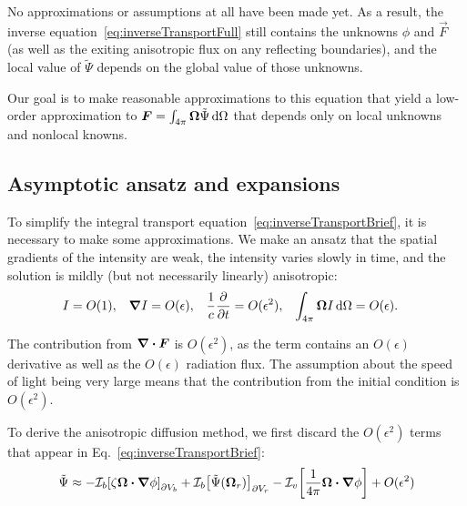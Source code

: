 
No approximations or assumptions at all have been made yet. As a
result, the inverse equation~\eqref{eq:inverseTransportFull} still contains
the unknowns $\phi$ and $\vec{F}$ (as well as the exiting anisotropic flux on
any reflecting boundaries), and the local value of
$\tilde\Psi$ depends on the global value of those unknowns.

Our goal is to make reasonable approximations to this equation that yield a
low-order approximation to $\bm{F}=\int_{4\pi}\bm{\Omega} \tilde\Psi
\mathop{}\!\mathrm{d}\Omega$ that
depends only on local unknowns and nonlocal knowns.

\subsection{Asymptotic ansatz and expansions}
To simplify the integral transport
equation~\eqref{eq:inverseTransportBrief}, it is necessary to make some
approximations. We make an ansatz that the spatial gradients of the intensity
are weak, the intensity varies slowly in time, and the solution is mildly
(but not necessarily linearly) anisotropic:
\begin{align} \label{eq:ansatz}
  I &= O(1), &
  \bm{\nabla} I &= O(\epsilon), &
  \frac{1}{c}\frac{\partial }{\partial t} &= O(\epsilon^2), &
  \int_{4\pi} \bm{\Omega} I\mathop{}\!\mathrm{d}\Omega &= O(\epsilon).
\end{align}

The contribution from $\bm{\nabla} \bm{\cdot}\bm{F}$ is $O(\epsilon^2)$, as the term
contains an $O(\epsilon)$ derivative as well as the $O(\epsilon)$ radiation
flux.  The assumption about the speed of light being very large means that the
contribution from the initial condition is $O(\epsilon^2)$.

To derive the anisotropic diffusion method, we first discard the $O(\epsilon^2)$
terms that appear in Eq.~\eqref{eq:inverseTransportBrief}:
\begin{equation} \label{eq:approxPsi1}
  \tilde\Psi \approx 
  -\mathcal{I}_{b}\!\left[\zeta \bm{\Omega}\bm{\cdot} \bm{\nabla} \phi\right]_{\partial V_b}
  + \mathcal{I}_{b}\!\left[\tilde\Psi(\bm{\Omega}_r)\right]_{\partial V_r}
  - \mathcal{I}_{v}\!\left[\frac{1}{4\pi} \bm{\Omega}\bm{\cdot} \bm{\nabla} \phi\right]
  + O(\epsilon^2)
\end{equation}

